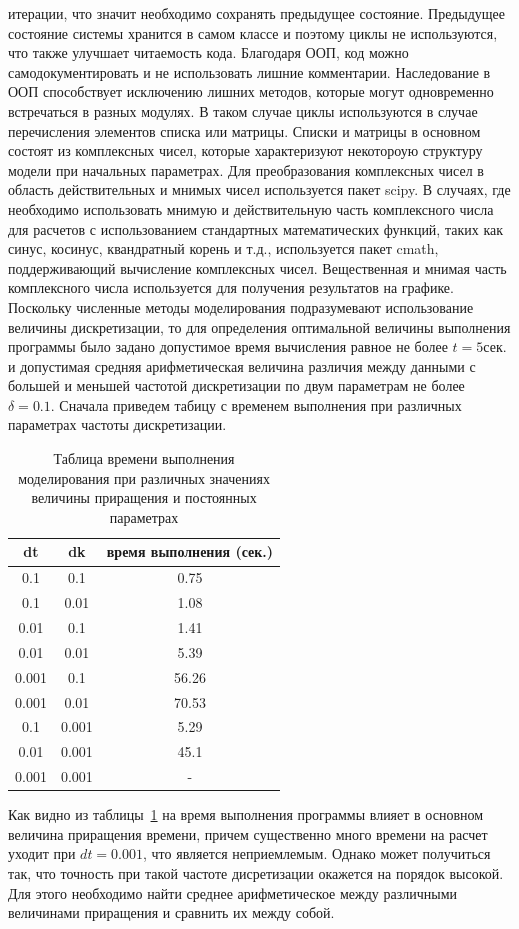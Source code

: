 итерации, что значит необходимо сохранять предыдущее состояние.
Предыдущее состояние системы хранится в самом классе и поэтому циклы не используются, что также улучшает
читаемость кода.
Благодаря ООП, код можно самодокументировать и не использовать лишние комментарии.
Наследование в ООП способствует исключению лишних методов, которые могут одновременно встречаться в разных модулях.
В таком случае циклы используются в случае перечисления элементов списка или матрицы.
Списки и матрицы в основном состоят из комплексных чисел, которые характеризуют некотороую структуру
модели при начальных параметрах.
Для преобразования комплексных чисел в область действительных и мнимых чисел используется пакет scipy.
В случаях, где необходимо использовать мнимую и действительную часть комплексного числа для расчетов
с использованием стандартных математических функций, таких как синус, косинус, квандратный корень и т.д.,
используется пакет cmath, поддерживающий вычисление комплексных чисел.
Вещественная и мнимая часть комплексного числа используется для получения результатов на графике.
Поскольку численные методы моделирования подразумевают использование величины дискретизации, то для определения
оптимальной величины выполнения программы было задано допустимое время вычисления равное не более
$t = 5$сек. и допустимая средняя арифметическая величина различия между данными с большей и меньшей
частотой дискретизации по двум параметрам не более $\delta = 0.1$.
Сначала приведем табицу с временем выполнения при различных параметрах частоты дискретизации.
\newpage
\begin{table}[h!]
    \caption{Таблица времени выполнения моделирования при различных значениях величины приращения и постоянных параметрах}
    \label{tabular:table_runtime}
    \small
    \begin{tabular}{|c|c|c|}
        dt & dk & время выполнения (сек.) \\
        \hline
        0.1 & 0.1 & 0.75 \\
        0.1 & 0.01 & 1.08 \\
        0.01 & 0.1 & 1.41 \\
        0.01 & 0.01 & 5.39 \\
        0.001 & 0.1 & 56.26 \\
        0.001 & 0.01 & 70.53 \\
        0.1 & 0.001 & 5.29 \\
        0.01 & 0.001 & 45.1 \\
        0.001 & 0.001 & - \\
    \end{tabular}
\end{table}
Как видно из таблицы~\ref{tabular:table_runtime} на время выполнения программы влияет в основном величина
приращения времени, причем существенно много времени на расчет уходит при $dt = 0.001$, что является неприемлемым.
Однако может получиться так, что точность при такой частоте дисретизации окажется на порядок высокой.
Для этого необходимо найти среднее арифметическое между различными величинами приращения
и сравнить их между собой.

